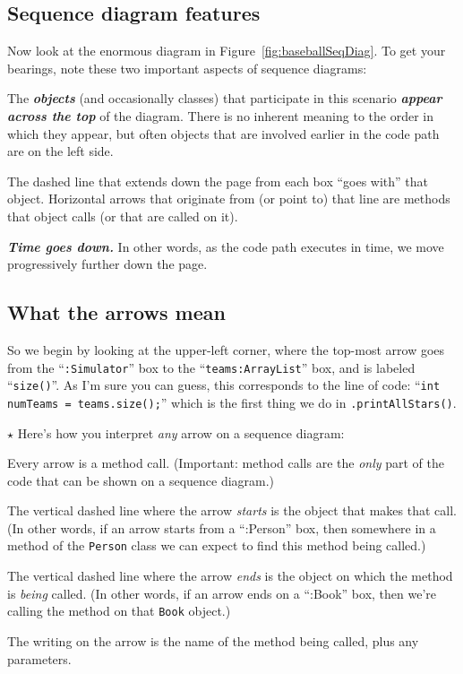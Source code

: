 \subsection{Sequence diagram features}

Now look at the enormous diagram in Figure~\ref{fig:baseballSeqDiag}. To get
your bearings, note these two important aspects of sequence diagrams:

\begin{compactitem}
\item The \textbf{\textit{objects}} (and occasionally classes) that
participate in this scenario \textbf{\textit{appear across the top}} of the
diagram. There is no inherent meaning to the order in which they appear, but
often objects that are involved earlier in the code path are on the left side.
\item The dashed line that extends down the page from each box ``goes with''
that object. Horizontal arrows that originate from (or point to) that line are
methods that object calls (or that are called on it).
\item \textit{\textbf{Time goes down.}} In other words, as the code path
executes in time, we move progressively further down the page.
\end{compactitem}

\subsection{What the arrows mean}

So we begin by looking at the upper-left corner, where the top-most arrow goes
from the ``\texttt{:Simulator}'' box to the ``\texttt{teams:ArrayList}'' box,
and is labeled ``\texttt{size()}''. As I'm sure you can guess, this corresponds
to the line of code: ``\texttt{int numTeams = teams.size();}'' which is the
first thing we do in \texttt{.printAllStars()}.

{\huge $\star$} Here's how you interpret \textit{any} arrow on a sequence diagram:

\begin{compactenum}
\item Every arrow is a method call. (Important: method calls are the
\textit{only} part of the code that can be shown on a sequence diagram.)
\item The vertical dashed line where the arrow \textit{starts} is the object
that makes that call. (In other words, if an arrow starts from a ``:Person''
box, then somewhere in a method of the \texttt{Person} class we can expect to
find this method being called.)
\item The vertical dashed line where the arrow \textit{ends} is the object on
which the method is \textit{being} called. (In other words, if an arrow ends
on a ``:Book'' box, then we're calling the method on that \texttt{Book}
object.)
\item The writing on the arrow is the name of the method being called, plus
any parameters.
\end{compactenum}

